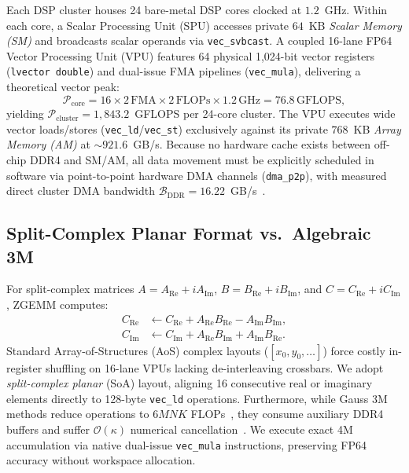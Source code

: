 \documentclass[conference]{IEEEtran}
\begin{document}
Each DSP cluster houses 24 bare-metal DSP cores clocked at $1.2$~GHz. Within each core, a Scalar Processing Unit (SPU) accesses private $64$~KB \emph{Scalar Memory (SM)} and broadcasts scalar operands via \texttt{vec\_svbcast}. A coupled 16-lane FP64 Vector Processing Unit (VPU) features 64 physical 1,024-bit vector registers (\texttt{lvector double}) and dual-issue FMA pipelines (\texttt{vec\_mula}), delivering a theoretical vector peak:
\begin{equation}
\mathcal{P}_{\mathrm{core}} = 16 \times 2\,\text{FMA} \times 2\,\text{FLOPs} \times 1.2\,\text{GHz} = 76.8\,\text{GFLOPS},
\label{eq:core_peak}
\end{equation}
yielding $\mathcal{P}_{\mathrm{cluster}} = 1{,}843.2$~GFLOPS per 24-core cluster. The VPU executes wide vector loads/stores (\texttt{vec\_ld}/\texttt{vec\_st}) exclusively against its private $768$~KB \emph{Array Memory (AM)} at $\sim\!921.6$~GB/s. Because no hardware cache exists between off-chip DDR4 and SM/AM, all data movement must be explicitly scheduled in software via point-to-point hardware DMA channels (\texttt{dma\_p2p}), with measured direct cluster DMA bandwidth $\mathcal{B}_{\mathrm{DDR}} = 16.22$~GB/s~\cite{qi2025constraint}.

\subsection{Split-Complex Planar Format vs.\ Algebraic 3M}
For split-complex matrices $A = A_{\mathrm{Re}} + i A_{\mathrm{Im}}$, $B = B_{\mathrm{Re}} + i B_{\mathrm{Im}}$, and $C = C_{\mathrm{Re}} + i C_{\mathrm{Im}}$, ZGEMM computes:
\begin{equation}
\begin{aligned}
C_{\mathrm{Re}} &\leftarrow C_{\mathrm{Re}} + A_{\mathrm{Re}} B_{\mathrm{Re}} - A_{\mathrm{Im}} B_{\mathrm{Im}}, \\
C_{\mathrm{Im}} &\leftarrow C_{\mathrm{Im}} + A_{\mathrm{Re}} B_{\mathrm{Im}} + A_{\mathrm{Im}} B_{\mathrm{Re}}.
\end{aligned}
\label{eq:zgemm_4m}
\end{equation}
Standard Array-of-Structures (AoS) complex layouts ($[x_0, y_0, \dots]$) force costly in-register shuffling on 16-lane VPUs lacking de-interleaving crossbars. We adopt \emph{split-complex planar} (SoA) layout, aligning 16 consecutive real or imaginary elements directly to 128-byte \texttt{vec\_ld} operations. Furthermore, while Gauss 3M methods reduce operations to $6MNK$ FLOPs~\cite{vanzee2017complex}, they consume auxiliary DDR4 buffers and suffer $\mathcal{O}(\kappa)$ numerical cancellation~\cite{higham2002accuracy}. We execute exact 4M accumulation via native dual-issue \texttt{vec\_mula} instructions, preserving FP64 accuracy without workspace allocation.
\end{document}
